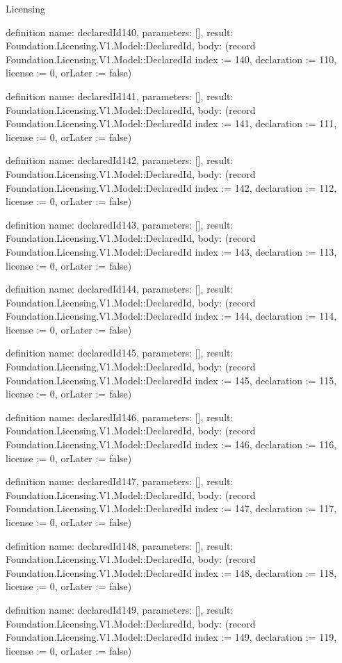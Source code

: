 \begin{lexlean}{Licensing}
\begin{semanticmodule}
definition{
  name: declaredId140,
  parameters: [],
  result: Foundation.Licensing.V1.Model::DeclaredId,
  body: (record Foundation.Licensing.V1.Model::DeclaredId {index := 140, declaration := 110, license := 0, orLater := false})
}

definition{
  name: declaredId141,
  parameters: [],
  result: Foundation.Licensing.V1.Model::DeclaredId,
  body: (record Foundation.Licensing.V1.Model::DeclaredId {index := 141, declaration := 111, license := 0, orLater := false})
}

definition{
  name: declaredId142,
  parameters: [],
  result: Foundation.Licensing.V1.Model::DeclaredId,
  body: (record Foundation.Licensing.V1.Model::DeclaredId {index := 142, declaration := 112, license := 0, orLater := false})
}

definition{
  name: declaredId143,
  parameters: [],
  result: Foundation.Licensing.V1.Model::DeclaredId,
  body: (record Foundation.Licensing.V1.Model::DeclaredId {index := 143, declaration := 113, license := 0, orLater := false})
}

definition{
  name: declaredId144,
  parameters: [],
  result: Foundation.Licensing.V1.Model::DeclaredId,
  body: (record Foundation.Licensing.V1.Model::DeclaredId {index := 144, declaration := 114, license := 0, orLater := false})
}

definition{
  name: declaredId145,
  parameters: [],
  result: Foundation.Licensing.V1.Model::DeclaredId,
  body: (record Foundation.Licensing.V1.Model::DeclaredId {index := 145, declaration := 115, license := 0, orLater := false})
}

definition{
  name: declaredId146,
  parameters: [],
  result: Foundation.Licensing.V1.Model::DeclaredId,
  body: (record Foundation.Licensing.V1.Model::DeclaredId {index := 146, declaration := 116, license := 0, orLater := false})
}

definition{
  name: declaredId147,
  parameters: [],
  result: Foundation.Licensing.V1.Model::DeclaredId,
  body: (record Foundation.Licensing.V1.Model::DeclaredId {index := 147, declaration := 117, license := 0, orLater := false})
}

definition{
  name: declaredId148,
  parameters: [],
  result: Foundation.Licensing.V1.Model::DeclaredId,
  body: (record Foundation.Licensing.V1.Model::DeclaredId {index := 148, declaration := 118, license := 0, orLater := false})
}

definition{
  name: declaredId149,
  parameters: [],
  result: Foundation.Licensing.V1.Model::DeclaredId,
  body: (record Foundation.Licensing.V1.Model::DeclaredId {index := 149, declaration := 119, license := 0, orLater := false})
}


\end{semanticmodule}
\end{lexlean}
